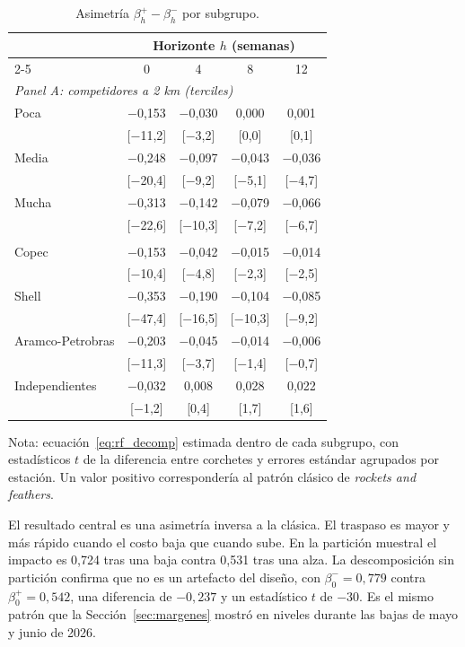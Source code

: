 \documentclass[11pt]{article}
\begin{document}
\begin{table}[htbp]
\centering
\caption{Asimetría $\beta_h^{+} - \beta_h^{-}$ por subgrupo.}
\label{tab:rf_asym}
\begin{tabular}{lcccc}
\toprule
 & \multicolumn{4}{c}{Horizonte $h$ (semanas)} \\
\cmidrule(lr){2-5}
 & 0 & 4 & 8 & 12 \\
\midrule
\multicolumn{5}{l}{\emph{Panel A: competidores a 2 km (terciles)}} \\
Poca   & $-$0,153 & $-$0,030 & 0,000 & 0,001 \\
       & [$-$11,2] & [$-$3,2] & [0,0] & [0,1] \\
Media  & $-$0,248 & $-$0,097 & $-$0,043 & $-$0,036 \\
       & [$-$20,4] & [$-$9,2] & [$-$5,1] & [$-$4,7] \\
Mucha  & $-$0,313 & $-$0,142 & $-$0,079 & $-$0,066 \\
       & [$-$22,6] & [$-$10,3] & [$-$7,2] & [$-$6,7] \\
\addlinespace
\multicolumn{5}{l}{\emph{Panel B: marca}} \\
Copec             & $-$0,153 & $-$0,042 & $-$0,015 & $-$0,014 \\
                  & [$-$10,4] & [$-$4,8] & [$-$2,3] & [$-$2,5] \\
Shell             & $-$0,353 & $-$0,190 & $-$0,104 & $-$0,085 \\
                  & [$-$47,4] & [$-$16,5] & [$-$10,3] & [$-$9,2] \\
Aramco-Petrobras  & $-$0,203 & $-$0,045 & $-$0,014 & $-$0,006 \\
                  & [$-$11,3] & [$-$3,7] & [$-$1,4] & [$-$0,7] \\
Independientes    & $-$0,032 & 0,008 & 0,028 & 0,022 \\
                  & [$-$1,2] & [0,4] & [1,7] & [1,6] \\
\bottomrule
\end{tabular}

\medskip
\begin{minipage}{0.92\textwidth}
\footnotesize
Nota: ecuación~\eqref{eq:rf_decomp} estimada dentro de cada subgrupo, con
estadísticos $t$ de la diferencia entre corchetes y errores estándar
agrupados por estación. Un valor positivo correspondería al patrón clásico
de \emph{rockets and feathers}.
\end{minipage}
\end{table}

El resultado central es una asimetría inversa a la clásica. El traspaso es
mayor y más rápido cuando el costo baja que cuando sube. En la partición
muestral el impacto es 0,724 tras una baja contra 0,531 tras una alza. La
descomposición sin partición confirma que no es un artefacto del diseño,
con $\beta_0^{-} = 0{,}779$ contra $\beta_0^{+} = 0{,}542$, una diferencia
de $-0{,}237$ y un estadístico $t$ de $-30$. Es el mismo patrón que la
Sección~\ref{sec:margenes} mostró en niveles durante las bajas de mayo y
junio de 2026.
\end{document}
